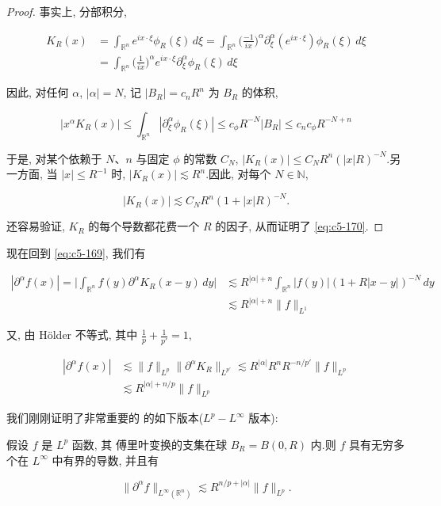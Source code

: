 \begin{proof}
事实上, 分部积分,

\[
\begin{aligned}
K_R(x) &= \int_{\mathbb{R}^n} e^{ix\cdot\xi}\phi_R(\xi)\, d\xi = \int_{\mathbb{R}^n}\Big(\frac{-1}{ix}\Big)^\alpha\partial_\xi^\alpha(e^{ix\cdot\xi})\phi_R(\xi)\, d\xi \\
&= \int_{\mathbb{R}^n}\Big(\frac{1}{ix}\Big)^\alpha e^{ix\cdot\xi}\partial_\xi^\alpha\phi_R(\xi)\, d\xi
\end{aligned}
\]

因此, 对任何 $\alpha$, $|\alpha| = N$, 记 $|B_R| = c_nR^n$ 为 $B_R$ 的体积,

\[
|x^\alpha K_R(x)| \leq \int_{\mathbb{R}^n}|\partial_\xi^\alpha\phi_R(\xi)| \leq c_\phi R^{-N}|B_R| \leq c_nc_\phi R^{-N+n}
\]

于是, 对某个依赖于 $N$、$n$ 与固定 $\phi$ 的常数 $C_N$, $|K_R(x)|\leq C_NR^n(|x|R)^{-N}$.另一方面, 当 $|x|\leq R^{-1}$ 时, $|K_R(x)|\lesssim R^n$.因此, 对每个 $N\in\mathbb{N}$,

\[
|K_R(x)|\lesssim C_NR^n(1+|x|R)^{-N}.
\]

还容易验证, $K_R$ 的每个导数都花费一个 $R$ 的因子, 从而证明了 \eqref{eq:c5-170}.
\end{proof}

现在回到 \eqref{eq:c5-169}, 我们有

\[
\begin{aligned}
|\partial^\alpha f(x)| = \Big|\int_{\mathbb{R}^n} f(y)\partial^\alpha K_R(x-y)\, dy\Big| &\lesssim R^{|\alpha|+n}\int_{\mathbb{R}^n}|f(y)|(1+R|x-y|)^{-N}\, dy \\
&\lesssim R^{|\alpha|+n}\|f\|_{L^1}
\end{aligned}
\]

又, 由 Hölder 不等式, 其中 $\frac{1}{p}+\frac{1}{p'} = 1$,

\[
\begin{aligned}
|\partial^\alpha f(x)| &\lesssim \|f\|_{L^p}\|\partial^\alpha K_R\|_{L^{p'}}\lesssim R^{|\alpha|}R^nR^{-n/p'}\|f\|_{L^p} \\
&\lesssim R^{|\alpha|+n/p}\|f\|_{L^p}
\end{aligned}
\]

我们刚刚证明了非常重要的 的如下版本($L^p-L^\infty$ 版本):

\begin{proposition}\label{prop:c5-4.6}
假设 $f$ 是 $L^p$ 函数, 其 傅里叶变换的支集在球 $B_R = B(0, R)$ 内.则 $f$ 具有无穷多个在 $L^\infty$ 中有界的导数, 并且有

\[
\|\partial^\alpha f\|_{L^\infty(\mathbb{R}^n)}\lesssim R^{n/p+|\alpha|}\|f\|_{L^p}.
\]
\end{proposition}

